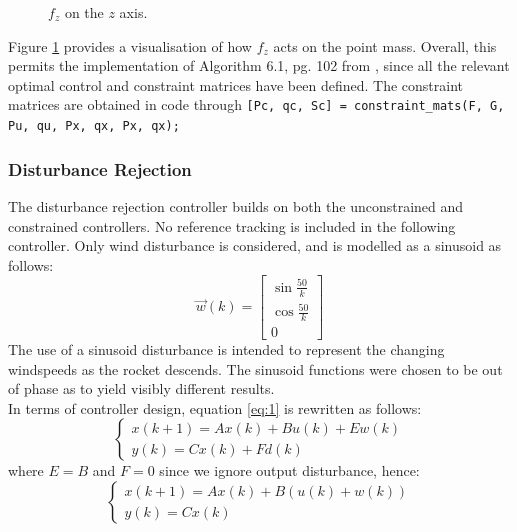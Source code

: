 \documentclass[conference, tikz]{IEEEtran}
\begin{document}
\begin{figure}[H]
\centering
{}
\caption{$f_z$ on the $z$ axis.} \label{tikz:axes}
\end{figure}

Figure \ref{tikz:axes} provides a visualisation of how $f_z$ acts on the point mass. 
Overall, this permits the implementation of Algorithm 6.1, pg. 102 from \cite{test}, since all the relevant optimal control and constraint matrices have been defined. 
The constraint matrices are obtained in code through \verb|[Pc, qc, Sc] = constraint_mats(F, G, Pu, qu, Px, qx, Px, qx);|



\subsubsection{Disturbance Rejection}
The disturbance rejection controller builds on both the unconstrained and constrained controllers. No reference tracking is included in the following controller. 
Only wind disturbance is considered, and is modelled as a sinusoid as follows:
\[
    \vec{w}(k)
    =
    \begin{bmatrix}
        \sin{\frac{50}{k}}\\
        \cos{\frac{50}{k}}\\
        0
    \end{bmatrix}
\]
The use of a sinusoid disturbance is intended to represent the changing windspeeds as the rocket descends. The sinusoid functions were chosen to be out of phase as to yield visibly different results. 
\\
In terms of controller design, equation \ref{eq:1} is rewritten as follows:
\[
    \begin{cases}
    x(k+1) = Ax(k) + Bu(k) + Ew(k)\\
    y(k) = Cx(k) + Fd(k)
    \end{cases}
\]
where $E = B$ and $F=0$ since we ignore output disturbance, hence:
\[
    \begin{cases}
        x(k+1) = Ax(k) + B(u(k) + w(k))\\
        y(k) = Cx(k)
    \end{cases}
\]
\end{document}
